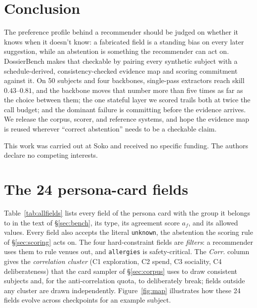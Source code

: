 \documentclass{article}
\newcommand{\bench}{DossierBench}
\begin{document}
\section{Conclusion}

The preference profile behind a recommender should be judged on whether it knows when it doesn't
know: a fabricated field is a standing bias on every later suggestion, while an abstention is
something the recommender can act on. \bench{} makes that checkable by pairing every synthetic
subject with a schedule-derived, consistency-checked evidence map and scoring commitment against it.
On 50 subjects and four backbones, single-pass extractors reach skill $0.43$--$0.81$, and the
backbone moves that number more than five times as far as the choice between them; the one stateful
layer we scored trails both at twice the call budget; and the dominant failure is committing before
the evidence arrives. We release the corpus, scorer, and reference systems, and hope the evidence
map is reused wherever ``correct abstention'' needs to be a checkable claim.

\begin{ack}
This work was carried out at Soko and received no specific funding. The authors declare no
competing interests.
\end{ack}




\clearpage
\appendix
\section{The 24 persona-card fields}
\label{app:fields}

Table~\ref{tab:allfields} lists every field of the persona card with the group it belongs to in
the text of \S\ref{sec:bench}, its type, its agreement score $a_f$, and its allowed values. Every
field also accepts the literal \texttt{unknown}, the abstention the scoring rule of
\S\ref{sec:scoring} acts on. The four hard-constraint fields are \emph{filters}: a recommender uses
them to rule venues out, and \texttt{allergies} is safety-critical. The \emph{Corr.} column gives the
\emph{correlation cluster} (C1 exploration, C2 spend, C3 sociality, C4 deliberateness) that the
card sampler of \S\ref{sec:corpus} uses to draw consistent subjects and, for the anti-correlation
quota, to deliberately break; fields outside any cluster are drawn independently.
Figure~\ref{fig:map} illustrates how these 24 fields evolve across checkpoints for an example subject.
\end{document}

